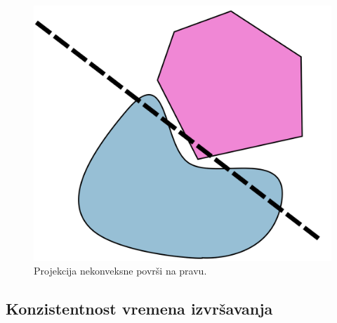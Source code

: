 \documentclass{article}
\begin{document}
{\begin{figure}[h!]
	\begin{center}
	\includegraphics[scale=0.15]{theorem_counterexample.png}
	\end{center}
	\caption{Projekcija nekonveksne površi na pravu.}
	\label{fig:counter}
\end{figure}

\subsection{Konzistentnost vremena izvršavanja}

}
\end{document}
